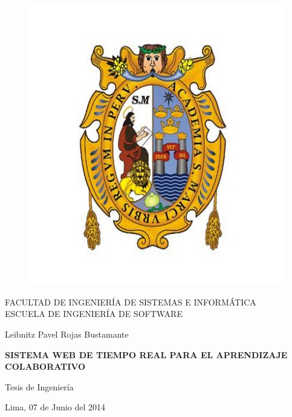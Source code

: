 \begin{titlepage}
\begin{center}
    \vspace*{-1in}
    \begin{figure}[htb]
        \begin{center}
            \includegraphics[scale=0.5]{./figuras/escudo_unmsm.jpg}
        \end{center}
    \end{figure}
    FACULTAD DE INGENIERÍA DE SISTEMAS E INFORMÁTICA\\
    \vspace*{0.5cm}
    ESCUELA DE INGENIERÍA DE SOFTWARE \\
    \vspace*{1cm}
    \begin{large}
    \end{large}
    \vspace*{1cm}
    \begin{center}
        Leibnitz Pavel Rojas Bustamante
    \end{center}
    \vspace*{2cm}
    \begin{Large}
    \textbf{SISTEMA WEB DE TIEMPO REAL PARA EL APRENDIZAJE COLABORATIVO} \\
    \end{Large}
    \vspace*{2cm}
    \begin{large}
        Tesis de Ingeniería\\
    \end{large}
    \vspace*{3cm}
    \begin{flushright}
    Lima, 07 de Junio del 2014
    \end{flushright}
\end{center}
\end{titlepage}